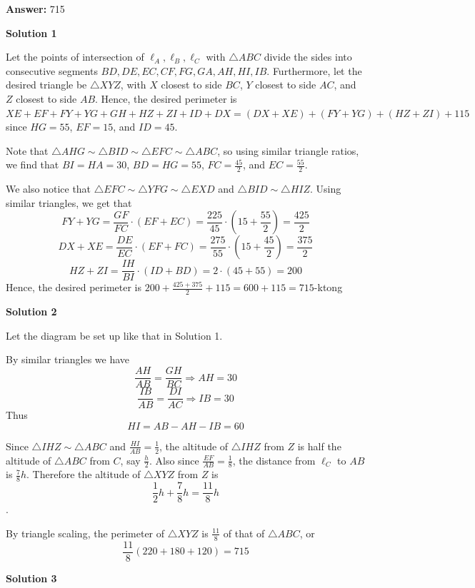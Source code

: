 \begin{enumerate}
 
 \textbf{Answer: }715



\textbf{Solution 1}

Let the points of intersection of $\ell_A, \ell_B,\ell_C$ with $\triangle ABC$ divide the sides into consecutive segments $BD,DE,EC,CF,FG,GA,AH,HI,IB$. Furthermore, let the desired triangle be $\triangle XYZ$, with $X$ closest to side $BC$, $Y$ closest to side $AC$, and $Z$ closest to side $AB$. Hence, the desired perimeter is $XE+EF+FY+YG+GH+HZ+ZI+ID+DX=(DX+XE)+(FY+YG)+(HZ+ZI)+115$ since $HG=55$, $EF=15$, and $ID=45$. 

 Note that $\triangle AHG\sim \triangle BID\sim \triangle EFC\sim \triangle ABC$, so using similar triangle ratios, we find that $BI=HA=30$, $BD=HG=55$, $FC=\frac{45}{2}$, and $EC=\frac{55}{2}$. 

 We also notice that $\triangle EFC\sim \triangle YFG\sim \triangle EXD$ and $\triangle BID\sim \triangle HIZ$. Using similar triangles, we get that 
 \[FY+YG=\frac{GF}{FC}\cdot \left(EF+EC\right)=\frac{225}{45}\cdot \left(15+\frac{55}{2}\right)=\frac{425}{2}\]
 \[DX+XE=\frac{DE}{EC}\cdot \left(EF+FC\right)=\frac{275}{55}\cdot \left(15+\frac{45}{2}\right)=\frac{375}{2}\]
 \[HZ+ZI=\frac{IH}{BI}\cdot \left(ID+BD\right)=2\cdot \left(45+55\right)=200\]Hence, the desired perimeter is $200+\frac{425+375}{2}+115=600+115=\boxed{715}$-ktong

 



\textbf{Solution 2}

Let the diagram be set up like that in Solution 1.

 By similar triangles we have 
 \[\frac{AH}{AB}=\frac{GH}{BC}\Longrightarrow AH=30\]
 \[\frac{IB}{AB}=\frac{DI}{AC}\Longrightarrow IB=30\]Thus 
 \[HI=AB-AH-IB=60\]

 Since $\bigtriangleup IHZ\sim\bigtriangleup ABC$ and $\frac{HI}{AB}=\frac{1}{2}$, the altitude of $\bigtriangleup IHZ$ from $Z$ is half the altitude of $\bigtriangleup ABC$ from $C$, say $\frac{h}{2}$. Also since $\frac{EF}{AB}=\frac{1}{8}$, the distance from $\ell_C$ to $AB$ is $\frac{7}{8}h$. Therefore the altitude of $\bigtriangleup XYZ$ from $Z$ is
 \[\frac{1}{2}h+\frac{7}{8}h=\frac{11}{8}h\].

 By triangle scaling, the perimeter of $\bigtriangleup XYZ$ is $\frac{11}{8}$ of that of $\bigtriangleup ABC$, or
 \[\frac{11}{8}(220+180+120)=\boxed{715}\]




\textbf{Solution 3}



\end{enumerate}

